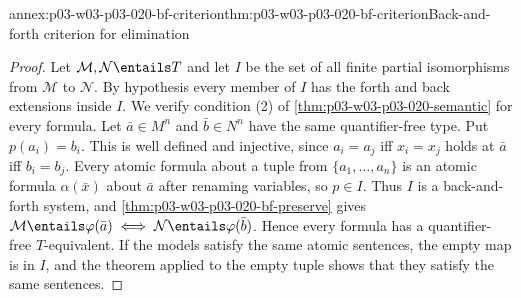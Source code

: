 \begin{annexitem}{annex:p03-w03-p03-020-bf-criterion}{thm:p03-w03-p03-020-bf-criterion}{Back-and-forth criterion for elimination}
\begin{proof}
Let \(\mathcal M,\mathcal N\entails T\) and let \(I\) be the set of all
finite partial isomorphisms from \(\mathcal M\) to \(\mathcal N\). By
hypothesis every member of \(I\) has the forth and back extensions inside
\(I\). We verify condition (2) of
\cref{thm:p03-w03-p03-020-semantic} for every formula. Let
\(\bar a\in M^n\) and \(\bar b\in N^n\) have the same quantifier-free type.
Put \(p(a_i)=b_i\). This is well defined and injective, since
\(a_i=a_j\) iff \(x_i=x_j\) holds at \(\bar a\) iff \(b_i=b_j\). Every
atomic formula about a tuple from \(\{a_1,\ldots,a_n\}\) is an atomic
formula \(\alpha(\bar x)\) about \(\bar a\) after renaming variables, so
\(p\in I\). Thus \(I\) is a back-and-forth system, and
\cref{thm:p03-w03-p03-020-bf-preserve} gives
\(\mathcal M\entails\varphi(\bar a)\iff\mathcal N\entails\varphi(\bar b)\).
Hence every formula has a quantifier-free \(T\)-equivalent. If the models
satisfy the same atomic sentences, the empty map is in \(I\), and the
theorem applied to the empty tuple shows that they satisfy the same
sentences.
\end{proof}
\end{annexitem}

